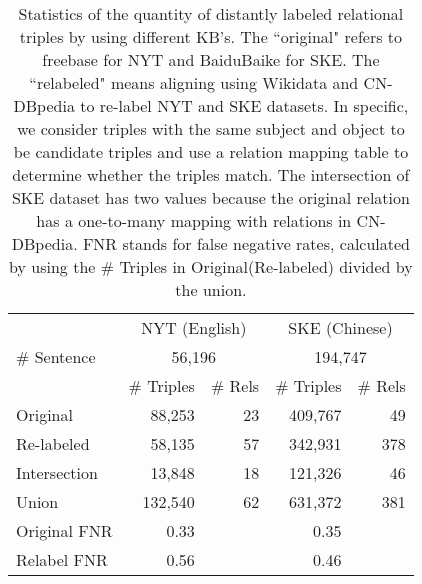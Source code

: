 \documentclass[11pt,a4paper]{article}
\begin{document}
\begin{table}[!htbp]
  \centering
\small
        \begin{tabular}{lrrrr}
        \toprule
                 & \multicolumn{2}{c}{NYT (English)} & \multicolumn{2}{c}{SKE (Chinese)} \\
        \cmidrule{2-5}    \# Sentence & \multicolumn{2}{c}{56,196} & \multicolumn{2}{c}{194,747} \\
        \midrule
                 & \multicolumn{1}{l}{\# Triples} & \multicolumn{1}{l}{\# Rels} & \multicolumn{1}{l}{\# Triples} & \multicolumn{1}{l}{\# Rels} \\
        \cmidrule{2-5}    Original & 88,253   & 23       & 409,767  & 49 \\
        Re-labeled & 58,135   & 57       & 342,931  & 378 \\
        Intersection & 13,848   & 18       & 121,326  & 46 \\
        Union    & 132,540  & 62       & 631,372  & 381 \\
        \midrule
        Original FNR &  0.33     &          &  0.35     &  \\
        Relabel FNR &  0.56     &          &  0.46     &  \\
        \bottomrule
    \end{tabular}\caption{Statistics of the quantity of distantly labeled relational triples by using different KB's. The ``original" refers to freebase for NYT and BaiduBaike for SKE. The ``relabeled" means aligning using Wikidata and CN-DBpedia to re-label NYT and SKE datasets.
    In specific, we consider triples with the same subject and object to be candidate triples and use a relation mapping table to determine whether the triples match.
    The intersection of SKE dataset has two values because the original relation has a one-to-many mapping with relations in CN-DBpedia. FNR stands for false negative rates, calculated by using the \# Triples in Original(Re-labeled) divided by the union.}
\label{tab:stat}\end{table}
\end{document}
